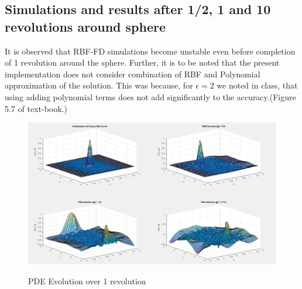 \documentclass[11pt]{article}
\begin{document}
\subsection{Simulations and results after 1/2, 1 and 10 revolutions around sphere}
It is observed that RBF-FD simulations become unstable even before completion of 1 revolution around the sphere.
Further, it is to be noted that the present implementation does not consider combination of RBF and Polynomial approximation of the solution. This was because, for $\epsilon = 2$ we noted in class, that using adding polynomial terms does not add significantly to the accuracy.(Figure 5.7 of text-book.)

\begin{figure}[h!]
\centering
\includegraphics[scale=0.4]{pdeEvolRBF_FD.jpg}\\
\caption{PDE Evolution over 1 revolution}
\label{fig:PDEvolGlobalRBF}
\end{figure}
\end{document}
